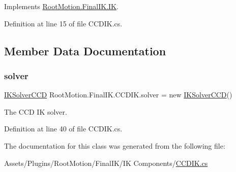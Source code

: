 Implements \mbox{\hyperlink{class_root_motion_1_1_final_i_k_1_1_i_k_a1922e31d550e27dcc60eca0d62c699c5}{Root\+Motion.\+Final\+I\+K.\+IK}}.



Definition at line 15 of file C\+C\+D\+I\+K.\+cs.



\subsection{Member Data Documentation}
\mbox{\label{class_root_motion_1_1_final_i_k_1_1_c_c_d_i_k_a0c05a77493ba07a331f33bb4d8d58821}} 
\subsubsection{\texorpdfstring{solver}{solver}}
{\footnotesize\ttfamily \mbox{\hyperlink{class_root_motion_1_1_final_i_k_1_1_i_k_solver_c_c_d}{I\+K\+Solver\+C\+CD}} Root\+Motion.\+Final\+I\+K.\+C\+C\+D\+I\+K.\+solver = new \mbox{\hyperlink{class_root_motion_1_1_final_i_k_1_1_i_k_solver_c_c_d}{I\+K\+Solver\+C\+CD}}()}



The C\+CD IK solver. 



Definition at line 40 of file C\+C\+D\+I\+K.\+cs.



The documentation for this class was generated from the following file\+:\begin{DoxyCompactItemize}
\item 
Assets/\+Plugins/\+Root\+Motion/\+Final\+I\+K/\+I\+K Components/\mbox{\hyperlink{_c_c_d_i_k_8cs}{C\+C\+D\+I\+K.\+cs}}\end{DoxyCompactItemize}
